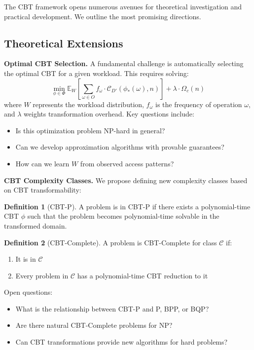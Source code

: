 \documentclass[11pt]{article}
\theoremstyle{definition}
\newtheorem{definition}{Definition}
\begin{document}
The CBT framework opens numerous avenues for theoretical investigation and practical development. We outline the most promising directions.

\subsection{Theoretical Extensions}

\textbf{Optimal CBT Selection.} A fundamental challenge is automatically selecting the optimal CBT for a given workload. This requires solving:
\begin{equation}
\min_{\phi \in \Phi} \mathbb{E}_W\left[\sum_{\omega \in O} f_\omega \cdot \mathcal{C}_{D'}(\phi_*(\omega), n)\right] + \lambda \cdot \Omega_c(n)
\end{equation}
where $W$ represents the workload distribution, $f_\omega$ is the frequency of operation $\omega$, and $\lambda$ weights transformation overhead. Key questions include:
\begin{itemize}
\item Is this optimization problem NP-hard in general?
\item Can we develop approximation algorithms with provable guarantees?
\item How can we learn $W$ from observed access patterns?
\end{itemize}

\textbf{CBT Complexity Classes.} We propose defining new complexity classes based on CBT transformability:

\begin{definition}[CBT-P]
A problem is in CBT-P if there exists a polynomial-time CBT $\phi$ such that the problem becomes polynomial-time solvable in the transformed domain.
\end{definition}

\begin{definition}[CBT-Complete]
A problem is CBT-Complete for class $\mathcal{C}$ if:
\begin{enumerate}
\item It is in $\mathcal{C}$
\item Every problem in $\mathcal{C}$ has a polynomial-time CBT reduction to it
\end{enumerate}
\end{definition}

Open questions:
\begin{itemize}
\item What is the relationship between CBT-P and P, BPP, or BQP?
\item Are there natural CBT-Complete problems for NP?
\item Can CBT transformations provide new algorithms for hard problems?
\end{itemize}
\end{document}
